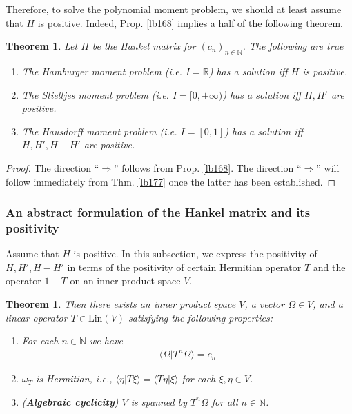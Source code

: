 \documentclass[12pt,b5paper,notitlepage]{article}
\theoremstyle{definition}
\theoremstyle{plain}
\newtheorem{thm}[df]{Theorem}
\newcommand{\bk}[1]{\langle {#1}\rangle}
\newcommand{\Nbb}{\mathbb N}
\newcommand{\Rbb}{\mathbb R}
\newcommand{\Lin}{\mathrm{Lin}}
\numberwithin{equation}{section}
\begin{document}
Therefore, to solve the polynomial moment problem, we should at least assume that $H$ is positive. Indeed, Prop. \ref{lb168} implies a half of the following theorem.
\begin{thm}\label{lb169}
Let $H$ be the Hankel matrix for $(c_n)_{n\in\Nbb}$. The following are true
\begin{enumerate}
\item The Hamburger moment problem (i.e. $I=\Rbb$) has a solution iff $H$ is positive.
\item The Stieltjes moment problem (i.e. $I=[0,+\infty)$) has a solution iff $H,H'$ are positive.
\item The Hausdorff moment problem (i.e. $I=[0,1]$) has a solution iff $H,H',H-H'$ are positive.
\end{enumerate}
\end{thm}


\begin{proof}
The direction ``$\Rightarrow$'' follows from Prop. \ref{lb168}. The direction ``$\Rightarrow$'' will follow immediately from Thm. \ref{lb177} once the latter has been established.
\end{proof}



\subsubsection{An abstract formulation of the Hankel matrix and its positivity}

Assume that $H$ is positive. In this subsection, we express the positivity of $H,H',H-H'$ in terms of the positivity of certain Hermitian operator $T$ and the operator $1-T$ on an inner product space $V$.

\begin{thm}\label{lb167}
Then there exists an inner product space $V$, a vector $\Omega\in V$, and a linear operator $T\in\Lin(V)$ satisfying the following properties:
\begin{enumerate}[label=(\arabic*)]
\item For each $n\in\Nbb$ we have
\begin{align}\label{eq85}
\bk{\Omega|T^n\Omega}=c_n
\end{align}
\item $\omega_T$ is Hermitian, i.e., $\bk{\eta|T\xi}=\bk{T\eta|\xi}$ for each $\xi,\eta\in V$.
\item (\textbf{Algebraic cyclicity}) $V$ is spanned by $T^n\Omega$ for all $n\in\Nbb$.
\end{enumerate}
\end{thm}
\end{document}
